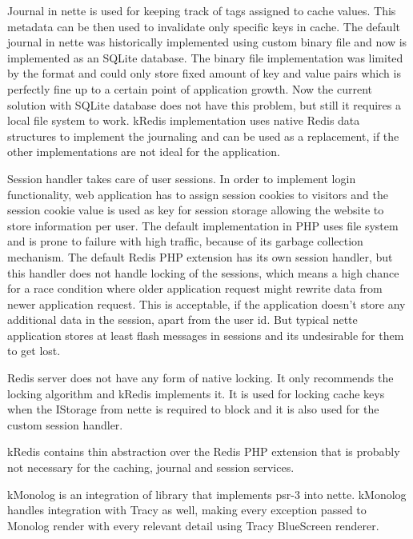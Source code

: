 Journal in \gls{nette} is used for keeping track of tags assigned to cache values. This metadata can be then used to invalidate only specific keys in cache. The default journal in \gls{nette} was historically implemented using custom binary file and now is implemented as an SQLite database. The binary file implementation was limited by the format and could only store fixed amount of key and value pairs which is perfectly fine up to a certain point of application growth. Now the current solution with SQLite database does not have this problem, but still it requires a local file system to work. \gls{kRedis} implementation uses native Redis data structures to implement the journaling and can be used as a replacement, if the other implementations are not ideal for the application.

Session handler takes care of user sessions. In order to implement login functionality, web application has to assign session cookies to visitors and the session cookie value is used as key for session storage allowing the website to store information per user. The default implementation in PHP uses file system and is prone to failure with high traffic, because of its garbage collection mechanism. The default Redis PHP extension has its own session handler, but this handler does not handle locking of the sessions, which means a high chance for a race condition where older application request might rewrite data from newer application request. This is acceptable, if the application doesn't store any additional data in the session, apart from the user id. But typical \gls{nette} application stores at least flash messages in sessions and its undesirable for them to get lost.

Redis server does not have any form of native locking. It only recommends the locking algorithm  and \gls{kRedis} implements it.
It is used for locking cache keys when the IStorage from \gls{nette} is required to block and it is also used for the custom session handler.

\gls{kRedis} contains thin abstraction over the Redis PHP extension that is probably not necessary for the caching, journal and session services.

 \label{sec:state:monolog}

\gls{kMonolog} is an integration of  library that implements \gls{psr}-3 into \gls{nette}. \gls{kMonolog} handles integration with Tracy as well, making every exception passed to Monolog render with every relevant detail using Tracy BlueScreen renderer.

